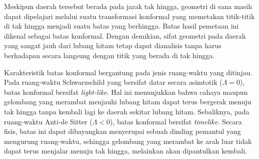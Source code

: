 Meskipun daerah tersebut berada pada jarak tak hingga, geometri di sana masih dapat dipelajari
melalui suatu transformasi konformal yang memetakan titik-titik di tak hingga menjadi suatu
batas yang berhingga. Batas hasil pemetaan ini dikenal sebagai batas konformal. Dengan
demikian, sifat geometri pada daerah yang sangat jauh dari lubang hitam tetap dapat dianalisis
tanpa harus berhadapan secara langsung dengan titik yang berada di tak hingga.

Karakteristik batas konformal bergantung pada jenis ruang-waktu yang ditinjau. Pada
ruang-waktu Schwarzschild yang bersifat datar secara asimtotik ($\Lambda = 0$), batas
konformal bersifat \textit{light-like}. Hal ini menunjukkan bahwa cahaya maupun gelombang
yang merambat menjauhi lubang hitam dapat terus bergerak menuju tak hingga tanpa kembali
lagi ke daerah sekitar lubang hitam. Sebaliknya, pada ruang-waktu Anti-de Sitter
($\Lambda < 0$), batas konformal bersifat \textit{timelike}. Secara fisis, batas ini dapat
dibayangkan menyerupai sebuah dinding pemantul yang mengurung ruang-waktu, sehingga gelombang
yang merambat ke arah luar tidak dapat terus menjalar menuju tak hingga, melainkan akan
dipantulkan kembali.
